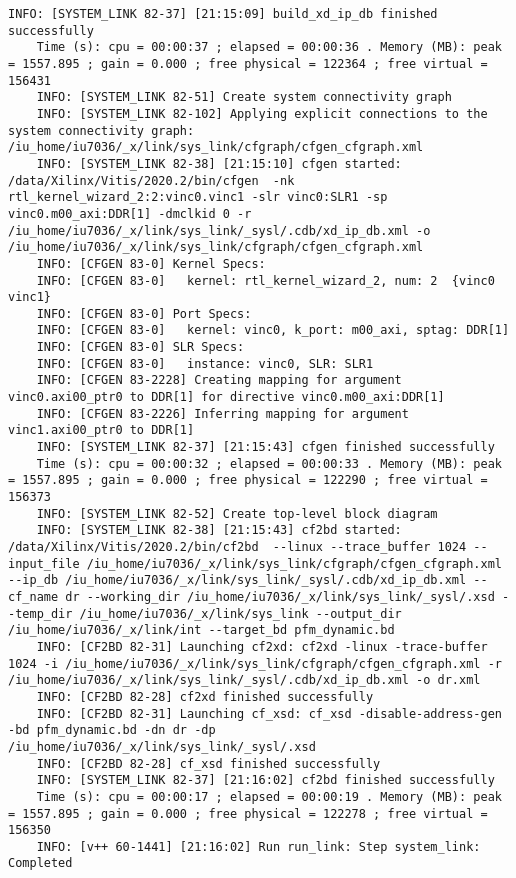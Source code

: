 \begin{lstlisting}[caption=Содержимое файла v++\_vinc.log для измененного проекта, label={log2}]
	INFO: [SYSTEM_LINK 82-37] [21:15:09] build_xd_ip_db finished successfully
	Time (s): cpu = 00:00:37 ; elapsed = 00:00:36 . Memory (MB): peak = 1557.895 ; gain = 0.000 ; free physical = 122364 ; free virtual = 156431
	INFO: [SYSTEM_LINK 82-51] Create system connectivity graph
	INFO: [SYSTEM_LINK 82-102] Applying explicit connections to the system connectivity graph: /iu_home/iu7036/_x/link/sys_link/cfgraph/cfgen_cfgraph.xml
	INFO: [SYSTEM_LINK 82-38] [21:15:10] cfgen started: /data/Xilinx/Vitis/2020.2/bin/cfgen  -nk rtl_kernel_wizard_2:2:vinc0.vinc1 -slr vinc0:SLR1 -sp vinc0.m00_axi:DDR[1] -dmclkid 0 -r /iu_home/iu7036/_x/link/sys_link/_sysl/.cdb/xd_ip_db.xml -o /iu_home/iu7036/_x/link/sys_link/cfgraph/cfgen_cfgraph.xml
	INFO: [CFGEN 83-0] Kernel Specs: 
	INFO: [CFGEN 83-0]   kernel: rtl_kernel_wizard_2, num: 2  {vinc0 vinc1}
	INFO: [CFGEN 83-0] Port Specs: 
	INFO: [CFGEN 83-0]   kernel: vinc0, k_port: m00_axi, sptag: DDR[1]
	INFO: [CFGEN 83-0] SLR Specs: 
	INFO: [CFGEN 83-0]   instance: vinc0, SLR: SLR1
	INFO: [CFGEN 83-2228] Creating mapping for argument vinc0.axi00_ptr0 to DDR[1] for directive vinc0.m00_axi:DDR[1]
	INFO: [CFGEN 83-2226] Inferring mapping for argument vinc1.axi00_ptr0 to DDR[1]
	INFO: [SYSTEM_LINK 82-37] [21:15:43] cfgen finished successfully
	Time (s): cpu = 00:00:32 ; elapsed = 00:00:33 . Memory (MB): peak = 1557.895 ; gain = 0.000 ; free physical = 122290 ; free virtual = 156373
	INFO: [SYSTEM_LINK 82-52] Create top-level block diagram
	INFO: [SYSTEM_LINK 82-38] [21:15:43] cf2bd started: /data/Xilinx/Vitis/2020.2/bin/cf2bd  --linux --trace_buffer 1024 --input_file /iu_home/iu7036/_x/link/sys_link/cfgraph/cfgen_cfgraph.xml --ip_db /iu_home/iu7036/_x/link/sys_link/_sysl/.cdb/xd_ip_db.xml --cf_name dr --working_dir /iu_home/iu7036/_x/link/sys_link/_sysl/.xsd --temp_dir /iu_home/iu7036/_x/link/sys_link --output_dir /iu_home/iu7036/_x/link/int --target_bd pfm_dynamic.bd
	INFO: [CF2BD 82-31] Launching cf2xd: cf2xd -linux -trace-buffer 1024 -i /iu_home/iu7036/_x/link/sys_link/cfgraph/cfgen_cfgraph.xml -r /iu_home/iu7036/_x/link/sys_link/_sysl/.cdb/xd_ip_db.xml -o dr.xml
	INFO: [CF2BD 82-28] cf2xd finished successfully
	INFO: [CF2BD 82-31] Launching cf_xsd: cf_xsd -disable-address-gen -bd pfm_dynamic.bd -dn dr -dp /iu_home/iu7036/_x/link/sys_link/_sysl/.xsd
	INFO: [CF2BD 82-28] cf_xsd finished successfully
	INFO: [SYSTEM_LINK 82-37] [21:16:02] cf2bd finished successfully
	Time (s): cpu = 00:00:17 ; elapsed = 00:00:19 . Memory (MB): peak = 1557.895 ; gain = 0.000 ; free physical = 122278 ; free virtual = 156350
	INFO: [v++ 60-1441] [21:16:02] Run run_link: Step system_link: Completed

\end{lstlisting}
